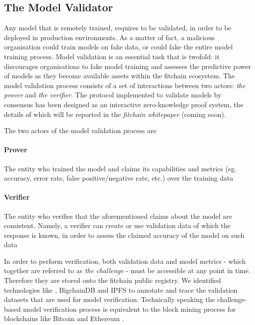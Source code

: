 \documentclass[12pt, a4paper,titlepage]{extreport}
\begin{document}
\subsection{The Model Validator}
Any model that is remotely trained, requires to be validated, in order to be deployed in production environments. As a matter of fact, a malicious organisation could train models on fake data, or could fake the entire model training process. 
Model validation is an essential task that is twofold: it discourages organisations to fake model training and assesses the predictive power of models as they become available assets within the fitchain ecosystem.
The model validation process consists of a set of interactions between two actors: \textit{the prover} and \textit{the verifier}. The protocol implemented to validate models by consensus has been designed as an interactive zero-knowledge\cite{zxsnarks} proof system, the details of which will be reported in the \textit{fitchain whitepaper} (coming soon).

The two actors of the model validation process are 

\paragraph{Prover}  The entity who trained the model and claims its capabilities and metrics (eg. accuracy, error rate, false positive/negative rate, etc.) over the training data

\paragraph{Verifier}  The entity who verifies that the aforementioned claims about the model are consistent. Namely, a verifier can create or use validation data of which the response is known, in order to assess the claimed accuracy of the model on such data

In order to perform verification, both validation data and model metrics - which together are referred to as \textit{the challenge} - must be accessible at any point in time. Therefore they are stored onto the fitchain public registry. We identified technologies like \cite{oceanprotocol}, BigchainDB \cite{bigchaindb} and IPFS \cite{ipfs} to annotate and trace the validation datasets that are used for model verification.
Technically speaking the challenge-based model verification process is equivalent to the block mining process for blockchains like Bitcoin \cite{bitcoin} and Ethereum \cite{ethereum}.
 
\end{document}
